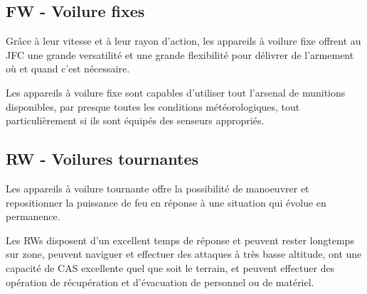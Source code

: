 \subsection{FW - Voilure fixes}

\e
    \item
    Grâce à leur vitesse et à leur rayon d'action, les appareils à voilure fixe offrent au JFC une grande versatilité et une grande flexibilité pour délivrer de l'armement où et quand c'est nécessaire.
    \item
    Les appareils à voilure fixe sont capables d'utiliser tout l'arsenal de munitions disponibles, par presque toutes les conditions météorologiques, tout particulièrement si ils sont équipés des senseurs appropriés.
\ed

\subsection{RW - Voilures tournantes}

\e
    \item Les appareils à voilure tournante offre la possibilité de manoeuvrer et repositionner la puissance de feu en réponse à une situation qui évolue en permanence.
    \item
    Les RWs disposent  d'un excellent temps de réponse et peuvent rester longtemps sur zone, peuvent naviguer et effectuer des attaques à très basse altitude, ont une capacité de CAS excellente quel que soit le terrain, et peuvent effectuer des opération de récupération et d'évacuation de personnel ou de matériel.
\ed 